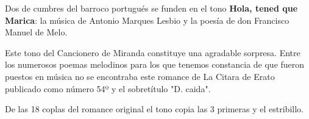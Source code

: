 
Dos de cumbres del barroco portugués se funden en el tono \textbf{Hola, tened que Marica}: la música de Antonio Marques Lesbio y la poesía de don Francisco Manuel de Melo.

Este tono del Cancionero de Miranda constituye una agradable sorpresa. Entre los numerosos poemas melodinos para los que tenemos constancia de que fueron puestos en música no se encontraba este romance de La Citara de Erato publicado como número 54º y el sobretítulo "D. caida".

De las 18 coplas del romance original el tono copia las 3 primeras y el estribillo. 

